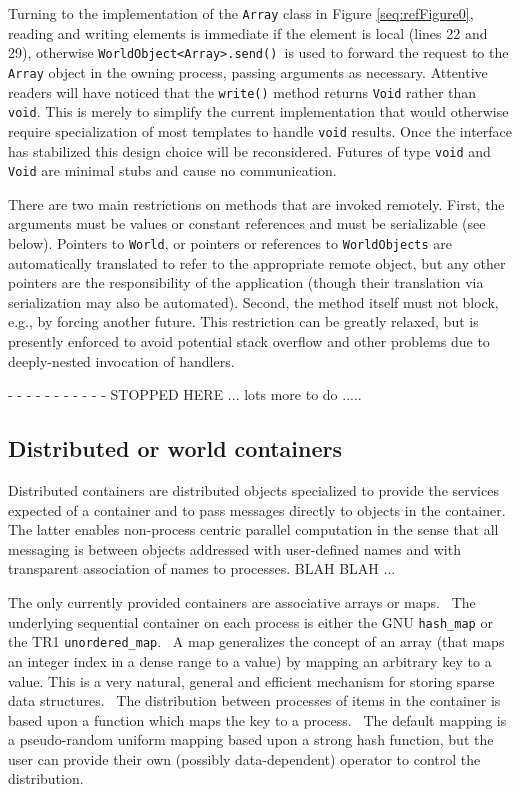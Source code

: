 \documentclass[letterpaper]{article}
\newcounter{Figure}
\begin{document}
Turning to the implementation of the \texttt{Array} class in Figure \ref{seq:refFigure0}, reading and writing elements
is immediate if the element is local (lines 22 and 29), otherwise
\texttt{WorldObject{\textless}Array{\textgreater}.send() }is used to forward the request to the \texttt{Array} object
in the owning process, passing arguments as necessary. Attentive readers will have noticed that the \texttt{write()}
method returns \texttt{Void} rather than \texttt{void}. This is merely to simplify the current implementation that
would otherwise require specialization of most templates to handle \texttt{void} results. Once the interface has
stabilized this design choice will be reconsidered. Futures of type \texttt{void} and \texttt{Void} are minimal stubs
and cause no communication.

There are two main restrictions on methods that are invoked remotely. First, the arguments must be values or constant
references and must be serializable (see below). Pointers to \texttt{World}, or pointers or references to
\texttt{WorldObjects} are automatically translated to refer to the appropriate remote object, but any other pointers
are the responsibility of the application (though their translation via serialization may also be automated). Second,
the method itself must not block, e.g., by forcing another future. This restriction can be greatly relaxed, but is
presently enforced to avoid potential stack overflow and other problems due to deeply-nested invocation of handlers.

{}- - - - - - - - - - - STOPPED HERE ... lots more to do .....

\subsection{Distributed or world containers}
Distributed containers are distributed objects specialized to provide the services expected of a container and to pass
messages directly to objects in the container. The latter enables non-process centric parallel computation in the sense
that all messaging is between objects addressed with user-defined names and with transparent association of names to
processes. BLAH BLAH ...

The only currently provided containers are associative arrays or maps. \ The underlying sequential container on each
process is either the GNU \texttt{hash\_map} or the TR1 \texttt{unordered\_map}. \ A map generalizes the concept of an
array (that maps an integer index in a dense range to a value) by mapping an arbitrary key to a value. This is a very
natural, general and efficient mechanism for storing sparse data structures. \ The distribution between processes of
items in the container is based upon a function which maps the key to a process. \ The default mapping is a
pseudo-random uniform mapping based upon a strong hash function, but the user can provide their own (possibly
data-dependent) operator to control the distribution. \ 
\end{document}

